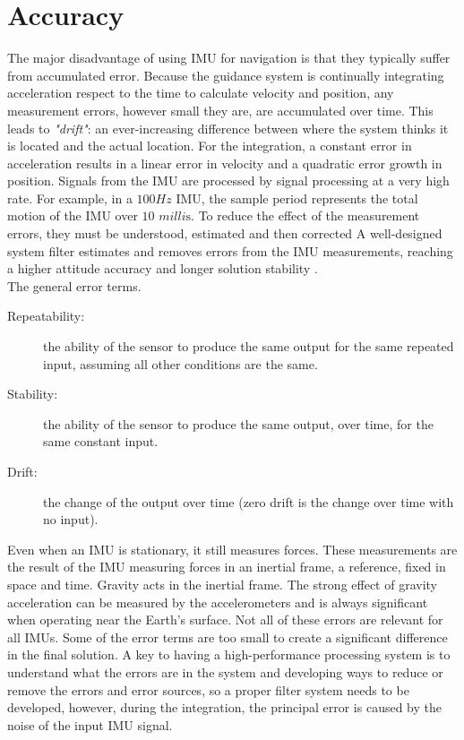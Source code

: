 \documentclass[tesi]{subfiles}
\begin{document}
\section{Accuracy}\label{sc:Error}
The major disadvantage of using IMU for navigation is that they typically suffer from accumulated error. Because the guidance system is continually integrating acceleration respect to the time to calculate velocity and position, any measurement errors, however small they are, are accumulated over time. This leads to \textit{"drift"}: an ever-increasing difference between where the system thinks it is located and the actual location. For the integration, a constant error in acceleration results in a linear error in velocity and a quadratic error growth in position.\cite{siciliano2016springer}
Signals from the IMU are processed by signal processing at a very high rate. For example, in a $100 Hz$ IMU, the sample period represents the total motion of the IMU over $10$ $ \si{milli\second}$. 
To reduce the effect of the measurement errors, they must be understood, estimated and then corrected
A well-designed system filter estimates and removes errors from the IMU measurements, reaching a higher attitude accuracy and longer solution stability .\\
The general error terms.
\begin{description}
\item [Repeatability:] the ability of the sensor to produce the same output for the same repeated input, assuming all other conditions are the same.
\item [Stability:] the ability of the sensor to produce the same output, over time, for the same constant input. 
\item [Drift:] the change of the output over time (zero drift is the change over time with no input).
\end{description}
Even when an IMU is stationary, it still measures forces. These measurements are the result of the IMU measuring forces in an inertial frame, a reference, fixed in space and time. Gravity acts in the inertial frame. The strong effect of gravity acceleration  can be measured by the accelerometers and is always significant when operating near the Earth’s surface.
Not all of these errors are relevant for all IMUs. Some of the error terms are too small to create a significant difference in the final solution. A key to having a high-performance processing system is to understand what the errors are in the system and developing ways to reduce or remove the errors and error sources, so a proper filter system needs to be developed, however, during the integration, the principal error is caused by the noise of the input IMU signal.
\end{document}
